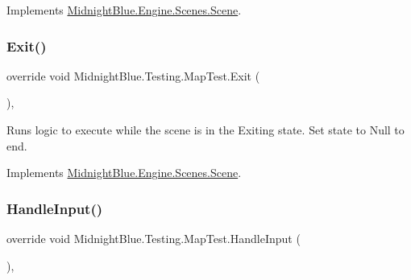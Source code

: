 Implements \hyperlink{class_midnight_blue_1_1_engine_1_1_scenes_1_1_scene_a6ec0b4be6c7dc226c9afd308e1fb3fd3}{Midnight\+Blue.\+Engine.\+Scenes.\+Scene}.

\hypertarget{class_midnight_blue_1_1_testing_1_1_map_test_a7dfcf609b9fd898f377297a0075d2159}{}\label{class_midnight_blue_1_1_testing_1_1_map_test_a7dfcf609b9fd898f377297a0075d2159} 
\subsubsection{\texorpdfstring{Exit()}{Exit()}}
{\footnotesize\ttfamily override void Midnight\+Blue.\+Testing.\+Map\+Test.\+Exit (\begin{DoxyParamCaption}{ }\end{DoxyParamCaption})\hspace{0.3cm}{\ttfamily [inline]}, {\ttfamily [virtual]}}



Runs logic to execute while the scene is in the Exiting state. Set state to Null to end. 



Implements \hyperlink{class_midnight_blue_1_1_engine_1_1_scenes_1_1_scene_adbf0f6d758df9fc5e20f24f327599e67}{Midnight\+Blue.\+Engine.\+Scenes.\+Scene}.

\hypertarget{class_midnight_blue_1_1_testing_1_1_map_test_ad7e54e4aec415ccf6e89ce8a8876d259}{}\label{class_midnight_blue_1_1_testing_1_1_map_test_ad7e54e4aec415ccf6e89ce8a8876d259} 
\subsubsection{\texorpdfstring{Handle\+Input()}{HandleInput()}}
{\footnotesize\ttfamily override void Midnight\+Blue.\+Testing.\+Map\+Test.\+Handle\+Input (\begin{DoxyParamCaption}{ }\end{DoxyParamCaption})\hspace{0.3cm}{\ttfamily [inline]}, {\ttfamily [virtual]}}



